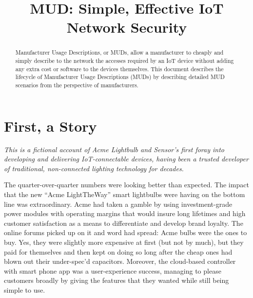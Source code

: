 \documentclass[conference]{IEEEtran}
\begin{document}
\title{MUD: Simple, Effective IoT Network Security}
\author{
\and
{}
}

\maketitle

\begin{abstract}
Manufacturer Usage Descriptions, or MUDs, allow a manufacturer to
cheaply and simply describe to the network the accesses required by an
IoT device without adding any extra cost or software to the devices
themselves.  This document describes the lifecycle of Manufacturer
Usage Descriptions (MUDs) by describing detailed MUD scenarios from
the perspective of manufacturers.
\end{abstract}

\section{First, a Story}
{\it This is a fictional account of {\rm Acme Lightbulb and Sensor}'s
  first foray into developing and delivering IoT-connectable devices,
  having been a trusted developer of traditional, non-connected
  lighting technology for decades.}

The quarter-over-quarter numbers were looking better than expected.
The impact that the new ``Acme LightTheWay'' smart lightbulbs were
having on the bottom line was extraordinary.  Acme had taken a gamble
by using investment-grade power modules with operating margins that
would insure long lifetimes and high customer satisfaction as a means
to differentiate and develop brand loyalty.  The online forums picked
up on it and word had spread: Acme bulbs were the ones to buy.  Yes,
they were slightly more expensive at first (but not by much), but they
paid for themselves and then kept on doing so long after the cheap
ones had blown out their under-spec'd capacitors.  Moreover, the
cloud-based controller with smart phone app was a user-experience
success, managing to please customers broadly by giving the features
that they wanted while still being simple to use.
\end{document}
